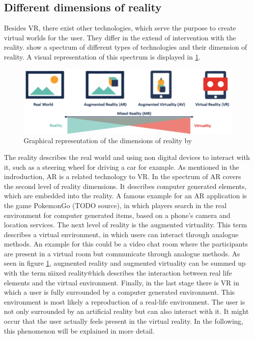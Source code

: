 \subsection{Different dimensions of reality}
Besides VR, there exist other technologies, which serve the purpose to create virtual worlds for the user. They differ in the extend of intervention with the reality. \cite{Tham.2018} show a spectrum of different types of technologies and their dimension of reality. A visual representation of this spectrum is displayed in \ref{fig:spectrum}.\\
\begin{figure}[h!]
  \includegraphics[width=14cm]{kapitel/spectrum-of-reality.png}
  \centering
  \caption{Graphical representation of the dimensions of reality by 	  \cite{Lovreglio.2018}}
  \label{fig:spectrum}
\end{figure}

The reality describes the real world and using non digital devices to interact with it, such as a steering wheel for driving a car for example. As mentioned in the indroduction, AR is a related technology to VR. In the spectrum of \cite{Tham.2018} AR covers the second level of reality dimensions. It describes computer generated elements, which are embedded into the reality. A famous example for an AR application is the game PokemonGo (TODO source), in which players search in the real environment for computer generated items, based on a phone's camera and location services. The next level of reality is the augmented virtuality. This term describes a virtual environment, in which users can interact through analogue methods. An example for this could be a video chat room where the participants are present in a virtual room but communicate through analogue methods. As seen in figure \ref{fig:spectrum}, augmented reality and augmented virtuality can be summed up with the term \"mixed reality\" which describes the interaction between real life elements and the virtual environment. Finally, in the last stage there is VR in which a user is fully surrounded by a computer generated environment. This environment is most likely a reproduction of a real-life environment. The user is not only surrounded by an artificial reality but can also interact with it. It might occur that the user actually feels present in the virtual reality. In the following, this phenomenon will be explained in more detail.

